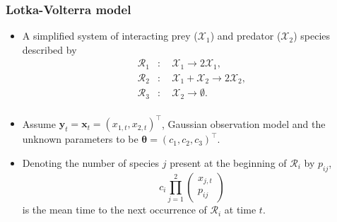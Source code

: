 \documentclass{beamer}
\newcommand{\bx}{\bm{x}}
\newcommand{\by}{\bm{y}}
\newcommand{\btheta}{\bm{\theta}}
\begin{document}
    \begin{frame}
    \frametitle{Lotka-Volterra model}
    \begin{itemize}
        \item A simplified system of interacting prey ($\mathcal{X}_1$) and predator ($\mathcal{X}_2$) species described by
        \begin{equation*}
        \begin{split}
        \mathcal{R}_1 &: \quad \mathcal{X}_1 \to 2 \mathcal{X}_1, \\
        \mathcal{R}_2 &: \quad \mathcal{X}_1 + \mathcal{X}_2 \to 2 \mathcal{X}_2, \\
        \mathcal{R}_3 &: \quad \mathcal{X}_2 \to \emptyset. \\
        \end{split}
        \end{equation*}
        \item Assume $\by_t = \bx_t = \left(x_{1,t}, x_{2,t}\right)^\intercal$, Gaussian observation model and the unknown parameters to be $\btheta = \left(c_1, c_2, c_3\right)^\intercal$.
        \item Denoting the number of species $j$ present at the beginning of $\mathcal{R}_i$ by $p_{ij}$,
        \begin{equation*}
            c_i \prod_{j=1}^{2} \begin{pmatrix}
            x_{j,t} \\
            p_{ij}
            \end{pmatrix}
        \end{equation*} is the mean time to the next occurrence of $\mathcal{R}_i$ at time $t$.
    \end{itemize}
    \end{frame}
\end{document}
